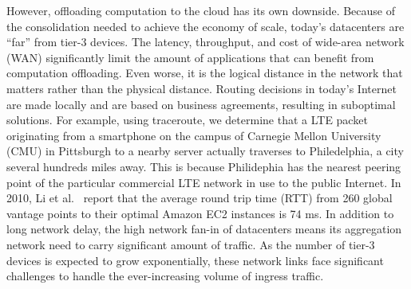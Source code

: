 However, offloading computation to the cloud has its own downside. Because of
the consolidation needed to achieve the economy of scale, today's datacenters
are ``far'' from tier-3 devices. The latency, throughput, and cost of wide-area
network (WAN) significantly limit the amount of applications that can benefit
from computation offloading. Even worse, it is the logical distance in the
network that matters rather than the physical distance. Routing decisions in
today's Internet are made locally and are based on business agreements,
resulting in suboptimal solutions. For example, using traceroute, we determine
that a LTE packet originating from a smartphone on the campus of Carnegie Mellon
University (CMU) in Pittsburgh to a nearby server actually traverses to
Philedelphia, a city several hundreds miles away. This is because Philidephia
has the nearest peering point of the particular commercial LTE network in use to
the public Internet. In 2010, Li et al.~\cite{li2010cloudcmp} report that the
average round trip time (RTT) from 260 global vantage points to their optimal
Amazon EC2 instances is 74 ms. In addition to long network delay, the high
network fan-in of datacenters means its aggregation network need to carry
significant amount of traffic. As the number of tier-3 devices is expected to
grow exponentially, these network links face significant challenges to handle
the ever-increasing volume of ingress traffic. 

